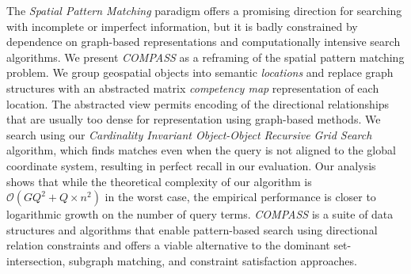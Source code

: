 
The \textit{Spatial Pattern Matching} paradigm offers a promising direction for searching with incomplete or imperfect information, but it is badly constrained by dependence on graph-based representations and computationally intensive search algorithms. 
We present \emph{COMPASS} as a reframing of the spatial pattern matching problem. 
We group geospatial objects into semantic \textit{locations} and replace graph structures with an abstracted matrix \textit{competency map} representation of each location. 
The abstracted view permits encoding of the directional relationships that are usually too dense for representation using graph-based methods. We search using our \textit{Cardinality Invariant Object-Object Recursive 
Grid Search} algorithm, which finds matches even when the query is not aligned to the global coordinate system, resulting in perfect recall in our evaluation. 
Our analysis shows that while the theoretical complexity of our algorithm is $\mathcal{O}(GQ^2 + Q\times n^2)$ 
in the worst case, the empirical performance is closer to logarithmic growth on the number of query terms.
\emph{COMPASS} is a suite of data structures and algorithms that enable pattern-based search using directional relation constraints and offers a viable alternative to the dominant set-intersection, subgraph matching, and constraint satisfaction approaches.




